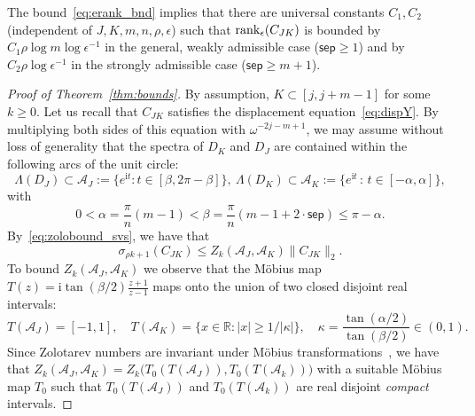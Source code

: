 \documentclass[final,reqno,onefignum,onetabnum]{siamart190516}
\newcommand{\sep}{\mathsf{sep}}
\newcommand{\erank}{{\rm rank}_\epsilon}
\newcommand{\iu}{\mathrm{i}}
\begin{document}
The bound~\eqref{eq:erank_bnd} implies that there are universal constants $C_1,C_2$ (independent of $J,K,m,n,\rho,\epsilon$)
such that $\erank(C_{JK})$ is bounded by $C_1 \rho \log m \log \epsilon^{-1}$ in the general, weakly admissible case ($\sep \ge 1$)
and by $C_2 \rho \log \epsilon^{-1}$ in the strongly admissible case ($\sep  \ge m + 1$).
\begin{proof}[Proof of Theorem~\ref{thm:bounds}]
By assumption, $K \subset [j,j\!+\!m\!-\!1]$ for some $k \ge 0$.
Let us recall that $C_{JK}$ satisfies the displacement equation~\eqref{eq:dispY}. By multiplying both sides of this equation with $\omega^{-2j-m+1}$,
we may assume without loss of generality that the spectra of $D_K$ and $D_J$ are contained within the following arcs of the unit circle:
\begin{equation*} %
 \Lambda(D_J) \subset \mathcal{A}_J := \{  e^{\iu t}: t \in [ \beta, 2 \pi \!- \!\beta]\},\ \Lambda(D_K) \subset \mathcal{A}_K := \{ e^{\iu t} \, :\, t \in [-\alpha, \alpha]\},
\end{equation*}
with 
\begin{equation} 
\label{eq:tau_kappa}
0 < \alpha = \frac{\pi}{n}(m\!-\!1) < \beta = \frac{\pi}{n}(m \!-\! 1\! + \!2 \cdot \sep) \leq \pi \!-\! \alpha.
\end{equation}
By~\eqref{eq:zolobound_svs}, we have that
\begin{equation} \label{eq:zolonew}
 \sigma_{\rho k + 1}(C_{JK}) \le Z_k(\mathcal{A}_J,\mathcal{A}_K) \|C_{JK}\|_2.
\end{equation}
To bound $Z_k( \mathcal{A}_J,\mathcal{A}_K)$ we observe that the M\"obius
map $T(z)= \mathrm i \tan(\beta/2) \frac{z+1}{z-1}$ maps  onto the union of two closed disjoint real intervals:
\[
T(\mathcal A_J) = [-1,1],\quad T(\mathcal A_K) = \big\{x\in \mathbb R\colon |x| \ge 1/|\kappa|\big\}, \quad \kappa = \frac{\tan(\alpha/2)}{\tan(\beta/2)} \in (0,1).
\]
Since Zolotarev numbers are invariant under M\"obius transformations~\cite{Beckermann2019}, we have that
$
 Z_k(\mathcal{A}_J, \mathcal{A}_K) = Z_k\big(T_0(T(\mathcal A_J)),T_0(T(\mathcal A_k))\big)$ with a suitable M\"obius map $T_0$ such that $T_0(T(\mathcal A_J))$ and $T_0(T(\mathcal A_k))$ are real disjoint \emph{compact} intervals.


\end{proof}
\end{document}
